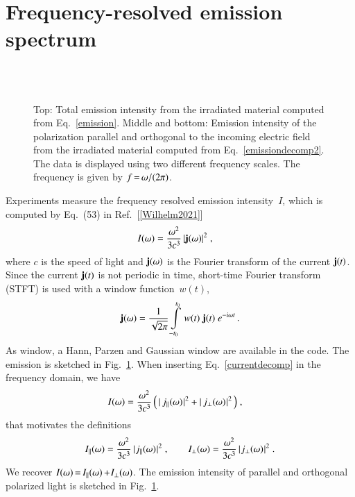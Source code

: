 \documentclass[11pt, a4paper]{scrartcl}
\newlength\figureheight
\newlength\figurewidth
\begin{document}
\section{Frequency-resolved emission spectrum}
\begin{figure}
\centering
\setlength\figureheight{7.0cm} 
\setlength{}

\\[1.0em]

\\[1.0em]
%

\caption{Top: Total emission intensity from the irradiated material computed from Eq.~\eqref{emission}. 
%
Middle and bottom: Emission intensity of the polarization parallel and orthogonal to the incoming electric field from the irradiated material computed from Eq.~\eqref{emissiondecomp2}.
%
The data is displayed using two different frequency scales. 
%
The frequency is given by $f\,{=}\,\omega/(2\pi)$.
}
    \label{fig:emission}
\end{figure}

Experiments measure the  frequency resolved emission intensity~$I$, which is computed by Eq.~(53) in Ref.~[\ref{Wilhelm2021}]
\begin{align}
I(\omega) &=
\frac{\omega^2}{3c^3}\,|\mathbf{j}(\omega)|^2\;, \label{emission}
\end{align}
where $c$ is the speed of light and $\mathbf{j}(\omega)$ is the Fourier transform of the current $\mathbf{j}(t)$.
%
Since the current $\mathbf{j}(t)$ is not periodic in time, short-time Fourier transform (STFT) is used with a window function~$w(t)$,
\begin{align}
    \mathbf{j}(\omega) = \frac{1}{\sqrt{2\pi}}\int\limits_{-t_0}^{t_0}\,w(t)\;\mathbf{j}(t)\;e^{-i\omega t}\,.
\end{align}
%
As window, a Hann, Parzen and Gaussian window are available in the code. 
%
The emission is sketched in Fig.~\ref{fig:emission}.
%
%
When inserting Eq.~\eqref{currentdecomp} in the frequency domain, we have
\begin{align}
I(\omega) &=
\frac{\omega^2}{3c^3}\,\Big(\,|\,  j_\parallel(\omega)\hspace{0.05em}|^2
+ |\,  j_\bot(\omega)\hspace{0.05em}|^2 \,\Big)
\;, \label{emissiondecomp}
\end{align}
that motivates the definitions
\begin{align}
I_\parallel(\omega) =
\frac{\omega^2}{3c^3}\, |\hspace{0.05em}  j_\parallel(\omega)\hspace{0.05em}|^2\;,
\hspace{2em}
I_\bot(\omega) =
\frac{\omega^2}{3c^3}\, |\hspace{0.05em}  j_\bot(\omega)\hspace{0.05em}|^2\;. \label{emissiondecomp2}
\end{align}
We recover $I(\omega)\,{=}\, I_\parallel(\omega)\,{+}\hspace{0.05em} I_\bot(\omega)$.
%
The emission intensity of parallel and orthogonal polarized light is sketched in Fig.~\ref{fig:emission}.
\end{document}
